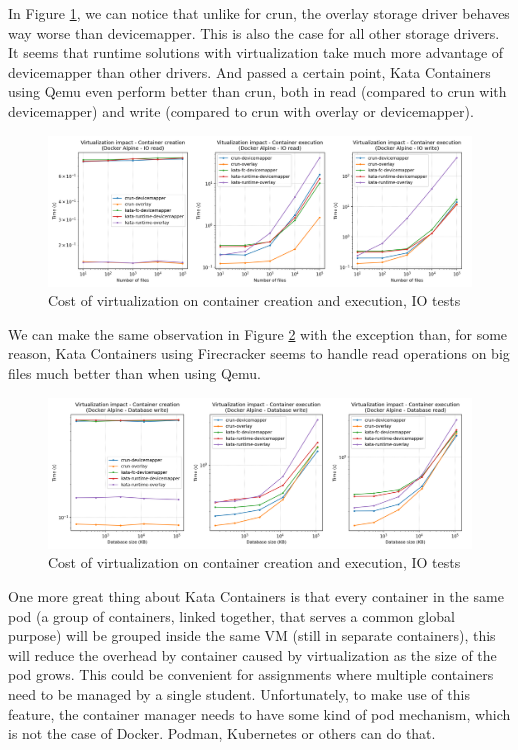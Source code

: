 In Figure \ref{fig:q3:virtualization:io}, we can notice that unlike for crun, the overlay storage driver behaves way worse than devicemapper.  This is also the case for all other storage drivers. It seems that runtime solutions with virtualization take much more advantage of devicemapper than other drivers.  And passed a certain point, Kata Containers using Qemu even perform better than crun, both in read (compared to crun with devicemapper) and write (compared to crun with overlay or devicemapper).

\begin{figure}[h!]
  \begin{center}
    \includegraphics[width=\linewidth]{images/question-3-virtualization-io.png}
    \caption{Cost of virtualization on container creation and execution, IO tests}
    \label{fig:q3:virtualization:io}
  \end{center}
\end{figure}

We can make the same observation in Figure \ref{fig:q3:virtualization:db} with the exception than, for some reason, Kata Containers using Firecracker seems to handle read operations on big files much better than when using Qemu.

\begin{figure}[h!]
  \begin{center}
    \includegraphics[width=\linewidth]{images/question-3-virtualization-db.png}
    \caption{Cost of virtualization on container creation and execution, IO tests}
    \label{fig:q3:virtualization:db}
  \end{center}
\end{figure}

One more great thing about Kata Containers is that every container in the same pod (a group of containers, linked together, that serves a common global purpose) will be grouped inside the same VM (still in separate containers), this will reduce the overhead by container caused by virtualization as the size of the pod grows.  This could be convenient for assignments where multiple containers need to be managed by a single student.  Unfortunately, to make use of this feature, the container manager needs to have some kind of pod mechanism, which is not the case of Docker.  Podman, Kubernetes or others can do that.
